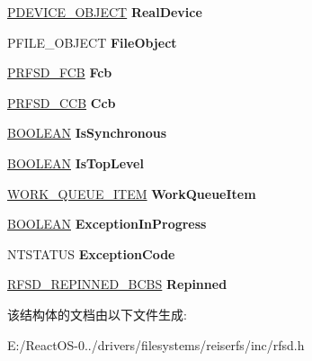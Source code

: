 \begin{DoxyCompactItemize}
\hyperlink{struct___d_e_v_i_c_e___o_b_j_e_c_t}{P\+D\+E\+V\+I\+C\+E\+\_\+\+O\+B\+J\+E\+CT} {\bfseries Real\+Device}
\item 
\mbox{\label{struct___r_f_s_d___i_r_p___c_o_n_t_e_x_t_a9c9ecabff52005808940ba32beda3a35}} 
P\+F\+I\+L\+E\+\_\+\+O\+B\+J\+E\+CT {\bfseries File\+Object}
\item 
\mbox{\label{struct___r_f_s_d___i_r_p___c_o_n_t_e_x_t_a0b6706a61bff1a4859116b9b7c3e6422}} 
\hyperlink{struct___r_f_s_d___f_c_b}{P\+R\+F\+S\+D\+\_\+\+F\+CB} {\bfseries Fcb}
\item 
\mbox{\label{struct___r_f_s_d___i_r_p___c_o_n_t_e_x_t_a865e24ea42167eb6a8344aa530ea5a28}} 
\hyperlink{struct___r_f_s_d___c_c_b}{P\+R\+F\+S\+D\+\_\+\+C\+CB} {\bfseries Ccb}
\item 
\mbox{\label{struct___r_f_s_d___i_r_p___c_o_n_t_e_x_t_a863e06f76622fcad30867b067cecd03f}} 
\hyperlink{_processor_bind_8h_a112e3146cb38b6ee95e64d85842e380a}{B\+O\+O\+L\+E\+AN} {\bfseries Is\+Synchronous}
\item 
\mbox{\label{struct___r_f_s_d___i_r_p___c_o_n_t_e_x_t_a6cb938c4ab1111a425baf12e5a7fd77e}} 
\hyperlink{_processor_bind_8h_a112e3146cb38b6ee95e64d85842e380a}{B\+O\+O\+L\+E\+AN} {\bfseries Is\+Top\+Level}
\item 
\mbox{\label{struct___r_f_s_d___i_r_p___c_o_n_t_e_x_t_a42740169f4e7db4b890297746feb98dd}} 
\hyperlink{struct___w_o_r_k___q_u_e_u_e___i_t_e_m}{W\+O\+R\+K\+\_\+\+Q\+U\+E\+U\+E\+\_\+\+I\+T\+EM} {\bfseries Work\+Queue\+Item}
\item 
\mbox{\label{struct___r_f_s_d___i_r_p___c_o_n_t_e_x_t_a1019b85a25dcc3a6466d9a55fa5209f1}} 
\hyperlink{_processor_bind_8h_a112e3146cb38b6ee95e64d85842e380a}{B\+O\+O\+L\+E\+AN} {\bfseries Exception\+In\+Progress}
\item 
\mbox{\label{struct___r_f_s_d___i_r_p___c_o_n_t_e_x_t_a0bc759191f368604549bd36b35d121e0}} 
N\+T\+S\+T\+A\+T\+US {\bfseries Exception\+Code}
\item 
\mbox{\label{struct___r_f_s_d___i_r_p___c_o_n_t_e_x_t_a5b1fad45571be9771900a676a5a48661}} 
\hyperlink{struct___r_f_s_d___r_e_p_i_n_n_e_d___b_c_b_s}{R\+F\+S\+D\+\_\+\+R\+E\+P\+I\+N\+N\+E\+D\+\_\+\+B\+C\+BS} {\bfseries Repinned}
\end{DoxyCompactItemize}


该结构体的文档由以下文件生成\+:\begin{DoxyCompactItemize}
\item 
E\+:/\+React\+O\+S-\/0../drivers/filesystems/reiserfs/inc/rfsd.\+h\end{DoxyCompactItemize}
